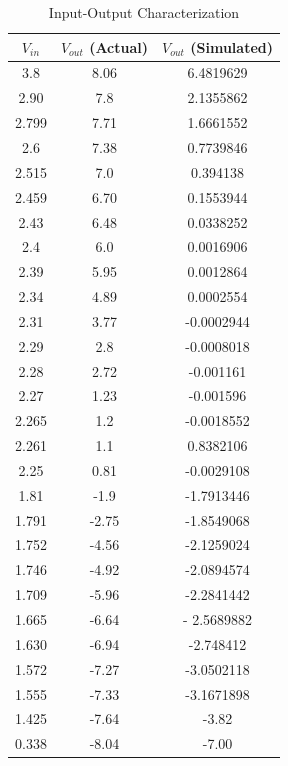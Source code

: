 \begin{table}[h]
	\centering
	\caption{Input-Output Characterization}
	\label{tbl:iovalues}
	\vspace{6pt}
	\footnotesize
	\begin{tabular}{ccc}
		\toprule
		$V_{in}$ & $V_{out}$ (Actual) & $V_{out}$ (Simulated) \\
		\midrule
		3.8 & 8.06 & 6.4819629 \\
		2.90 &7.8 & 2.1355862 \\
		2.799 &7.71 & 1.6661552 \\
		2.6 &7.38 & 0.7739846 \\
		2.515 &7.0 & 0.394138 \\
		2.459 &6.70 & 0.1553944 \\
		2.43 &6.48 & 0.0338252 \\
		2.4 &6.0 & 0.0016906 \\
		2.39 &5.95 & 0.0012864 \\
		2.34 &4.89 & 0.0002554 \\
		2.31 &3.77 & -0.0002944 \\
		2.29 &2.8 & -0.0008018 \\
		2.28 &2.72 & -0.001161 \\
		2.27 &1.23 & -0.001596 \\
		2.265 &1.2 & -0.0018552 \\
		2.261 &1.1 & 0.8382106 \\
		2.25 &0.81 & -0.0029108 \\
		1.81 &-1.9 & -1.7913446 \\
		1.791 &-2.75 & -1.8549068 \\
		1.752 &-4.56 & -2.1259024 \\
		1.746 &-4.92 & -2.0894574 \\
		1.709 &-5.96 & -2.2841442 \\
		1.665 &-6.64 &- 2.5689882 \\
		1.630 &-6.94 & -2.748412 \\
		1.572 &-7.27 & -3.0502118 \\
		1.555 &-7.33 & -3.1671898 \\
		1.425 &-7.64 & -3.82 \\
		0.338 &-8.04 & -7.00 \\
		\bottomrule
	\end{tabular}
\end{table}
